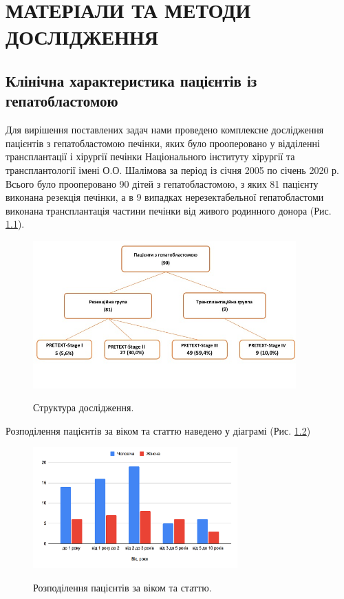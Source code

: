 \chapter{МАТЕРІАЛИ ТА МЕТОДИ ДОСЛІДЖЕННЯ}
\section{Клінічна характеристика пацієнтів із гепатобластомою}
Для вирішення поставлених задач нами проведено комплексне дослідження пацієнтів з гепатобластомою печінки, яких було прооперовано у відділенні трансплантації і хірургії печінки Національного інституту хірургії та трансплантології імені О.О. Шалімова за період із січня 2005 по січень 2020 р. Всього було прооперовано 90 дітей з гепатобластомою, з яких 81 пацієнту виконана резекція печінки, а в 9 випадках нерезектабельної гепатобластоми виконана трансплантація частини печінки від живого родинного донора (Рис. \ref{fig:90-81-9}). 

\begin{figure}[h]
\centering
\includegraphics[width=0.9\textwidth]{Illustrations/90-81-9.jpeg}
\label{fig:90-81-9} %
\caption{Структура дослідження.}
\end{figure}


Розподілення пацієнтів за віком та статтю наведено у діаграмі (Рис. \ref{fig:mw})


\begin{figure}[h]
\centering
\includegraphics[width=0.7\textwidth]{Illustrations/mw.png}
\label{fig:mw} %
\caption{Розподілення пацієнтів за віком та статтю.}
\end{figure}


